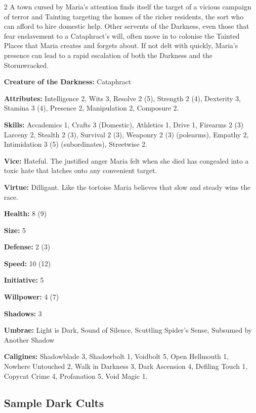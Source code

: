 \begin{multicols}{2}
A town cursed by Maria's attention finds itself the target of a vicious campaign of terror and Tainting targeting the homes of the richer residents, the sort who can afford to hire domestic help. Other servents of the Darkness, even those that fear enslavement to a Cataphract's will, often move in to colonise the Tainted Places that Maria creates and forgets about. If not delt with quickly, Maria's presence can lead to a rapid escalation of both the Darkness and the Stormwracked. 

\noindent \textbf{Creature of the Darkness:} Cataphract

\noindent \textbf{Attributes:} Intelligence 2, Wits 3, Resolve 2 (5), Strength 2 (4), Dexterity 3, Stamina 3 (4), Presence 2, Manipulation 2, Composure 2.

\noindent \textbf{Skills:} Accademics 1, Crafts 3 (Domestic), Athletics 1, Drive 1, Firearms 2 (3) Larceny 2, Stealth 2 (3), Survival 2 (3), Weaponry 2 (3) (polearms), Empathy 2, Intimidation 3 (5) (subordinates), Streetwise 2. 

\noindent \textbf{Vice:} Hateful. The justified anger Maria felt when she died has congealed into a toxic hate that latches onto any convenient target. 

\noindent \textbf{Virtue:} Dilligant. Like the tortoise Maria believes that slow and steady wins the race.

\noindent \textbf{Health:} 8 (9)

\noindent \textbf{Size:} 5

\noindent \textbf{Defense:} 2 (3)

\noindent \textbf{Speed:} 10 (12)

\noindent \textbf{Initiative:} 5

\noindent \textbf{Willpower:} 4 (7)

\noindent \textbf{Shadows:} 3

\noindent \textbf{Umbrae:} Light is Dark, Sound of Silence, Scuttling Spider's Sense, Subsumed by Another Shadow

\noindent \textbf{Caligines:} Shadowblade 3, Shadowbolt 1, Voidbolt 5, Open Hellmouth 1, Nowhere Untouched 2, Walk in Darkness 3, Dark Ascension 4, Defiling Touch 1, Copycat Crime 4, Profanation 5, Void Magic 1. 

\subsection*{Sample Dark Cults}

\label{subsec:SampleDarkCults}

\end{multicols}
